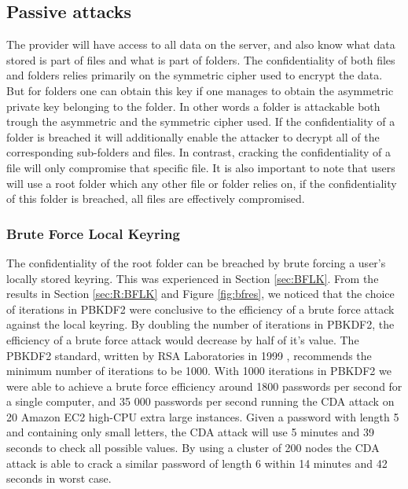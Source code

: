\documentclass[pdftex,english,10pt,b5paper,twoside]{book}
\begin{document}
\subsection{Passive attacks}
The provider will have access to all data on the server, and also know what
data stored is part of files and what is part of folders. The confidentiality
of both files and folders relies primarily on the symmetric cipher used to
encrypt the data. But for folders one can obtain this key if one manages to
obtain the asymmetric private key belonging to the folder. In other words a
folder is attackable both trough the asymmetric and the symmetric cipher used.
If the confidentiality of a folder is breached it will additionally enable the
attacker to decrypt all of the corresponding sub-folders and files. In contrast,
cracking the confidentiality of a file will only compromise that specific file. It is
also important to note that users will use a root folder which any other file
or folder relies on, if the confidentiality of this folder is breached, all
files are effectively compromised.

\subsubsection{Brute Force Local Keyring}
The confidentiality of the root folder can be breached by brute forcing a user's
locally stored keyring. This was experienced in Section \ref{sec:BFLK}. From the
results in Section \ref{sec:R:BFLK} and Figure \ref{fig:bfres}, we noticed
that the choice of iterations in PBKDF2 were conclusive to the efficiency of a
brute force attack against the local keyring. By doubling the number of
iterations in PBKDF2, the efficiency of a brute force attack would decrease by
half of it's value. The PBKDF2 standard, written by RSA Laboratories in 1999 \cite{PBKDF2std},
recommends the minimum number of iterations to be 1000. With 1000 iterations in
PBKDF2 we were able to achieve a brute force efficiency around 1800 passwords
per second for a single computer, and 35 000 passwords per second running the
CDA attack on 20 Amazon EC2 high-CPU extra large instances. Given a password
with length 5 and containing only small letters, the CDA attack will use 5
minutes and 39 seconds to check all possible values. By using a cluster of 200
nodes the CDA attack is able to crack a similar password of length 6 within 14 minutes
and 42 seconds in worst case.\\
\end{document}
